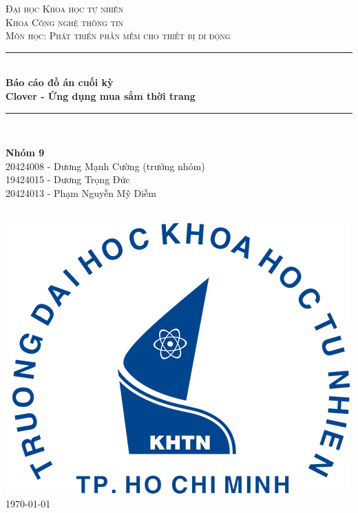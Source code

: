 \documentclass[12pt]{article}
\begin{document}
\begin{titlepage}

    \newcommand{\HRule}{\rule{\linewidth}{0.5mm}}

    \center

    \textsc{\LARGE Đại học Khoa học tự nhiên}\\[1.5cm]
    \textsc{\Large Khoa Công nghệ thông tin}\\[0.5cm]
    \textsc{\large Môn học: Phát triển phần mềm cho thiết bị di động }\\[0.5cm]

    \HRule \\[0.4cm]
    { \huge \bfseries Báo cáo đồ án cuối kỳ\\Clover - Ứng dụng mua sắm thời trang}\\[0.4cm]
    \HRule \\[1.5cm]

    \begin{minipage}{1.\textwidth}
        \begin{flushleft} \large
            \textbf{Nhóm 9}\\
            20424008 - Dương Mạnh Cường (trưởng nhóm)\\
            19424015 - Dương Trọng Đức\\
            20424013 - Phạm Nguyễn Mỹ Diễm
        \end{flushleft}
    \end{minipage}\\[2cm]

    \includegraphics{images/logo.png}\\[1cm]

    \today
\end{titlepage}
\end{document}
